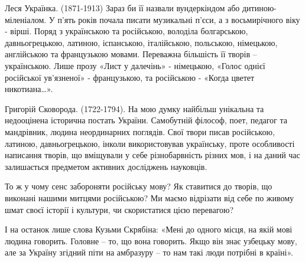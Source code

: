 Леся Українка. (1871-1913) Зараз би її назвали вундеркіндом або
дитиною-міленіалом. У п’ять років почала писати музикальні п’єси, а з
восьмирічного віку - вірші. Поряд з українською та російською, володіла
болгарською, давньогрецькою, латиною, іспанською, італійською, польською,
німецькою, англійською та французькою мовами. Переважна більшість її творів –
українською. Лише прозу «Лист у далечінь» - німецькою, «Голос однієї російської
ув’язненої» - французькою, та російською - «Когда цветет никотиана…».

Григорій Сковорода. (1722-1794). На мою думку найбільш унікальна та недооцінена
історична постать України. Самобутній філософ, поет, педагог та мандрівник,
людина неординарних поглядів. Свої твори писав російською, латиною,
давньогрецькою, інколи використовував українську, проте особливості написання
творів, що вміщували у себе різнобарвність різних мов, і на даний час
залишається предметом активних досліджень науковців.

То ж у чому сенс забороняти російську мову? Як ставитися до творів, що виконані
нашими митцями російською? Ми маємо відрізати від себе по живому шмат своєї
історії і культури, чи скористатися цією перевагою?

І на останок лише слова Кузьми Скрябіна: «Мені до одного місця, на якій мові
людина говорить. Головне – то, що вона говорить. Якщо він знає узбецьку мову,
але за Україну згідний піти на амбразуру – то нам такі люди потрібні в країні».

